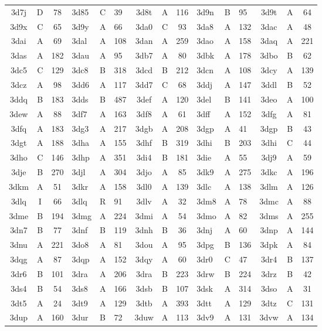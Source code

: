 \begin{longtable}{|c|c|c| a|a|a| c|c|c| a|a|a| c|c|c|}
3d7j & D & 78 & 3d85 & C & 39 & 3d8t & A & 116 & 3d9n & B & 95 & 3d9t & A & 64\\
3d9x & C & 65 & 3d9y & A & 66 & 3da0 & C & 93 & 3da8 & A & 132 & 3dac & A & 48\\
3dai & A & 69 & 3dal & A & 108 & 3dan & A & 259 & 3dao & A & 158 & 3daq & A & 221\\
3das & A & 182 & 3dau & A & 95 & 3db7 & A & 80 & 3dbk & A & 178 & 3dbo & B & 62\\
3dc5 & C & 129 & 3dc8 & B & 318 & 3dcd & B & 212 & 3dcn & A & 108 & 3dcy & A & 139\\
3dcz & A & 98 & 3dd6 & A & 117 & 3dd7 & C & 68 & 3ddj & A & 147 & 3ddl & B & 52\\
3ddq & B & 183 & 3dds & B & 487 & 3def & A & 120 & 3del & B & 141 & 3deo & A & 100\\
3dew & A & 88 & 3df7 & A & 163 & 3df8 & A & 61 & 3dff & A & 152 & 3dfg & A & 81\\
3dfq & A & 183 & 3dg3 & A & 217 & 3dgb & A & 208 & 3dgp & A & 41 & 3dgp & B & 43\\
3dgt & A & 188 & 3dha & A & 155 & 3dhf & B & 319 & 3dhi & B & 203 & 3dhi & C & 44\\
3dho & C & 146 & 3dhp & A & 351 & 3di4 & B & 181 & 3die & A & 55 & 3dj9 & A & 59\\
3dje & B & 270 & 3djl & A & 304 & 3djo & A & 85 & 3dk9 & A & 275 & 3dkc & A & 196\\
3dkm & A & 51 & 3dkr & A & 158 & 3dl0 & A & 139 & 3dlc & A & 138 & 3dlm & A & 126\\
3dlq & I & 66 & 3dlq & R & 91 & 3dlv & A & 32 & 3dm8 & A & 78 & 3dmc & A & 88\\
3dme & B & 194 & 3dmg & A & 224 & 3dmi & A & 54 & 3dmo & A & 82 & 3dms & A & 255\\
3dn7 & B & 77 & 3dnf & B & 119 & 3dnh & B & 36 & 3dnj & A & 60 & 3dnp & A & 144\\
3dnu & A & 221 & 3do8 & A & 81 & 3dou & A & 95 & 3dpg & B & 136 & 3dpk & A & 84\\
3dqg & A & 87 & 3dqp & A & 152 & 3dqy & A & 60 & 3dr0 & C & 47 & 3dr4 & B & 137\\
3dr6 & B & 101 & 3dra & A & 206 & 3dra & B & 223 & 3drw & B & 224 & 3drz & B & 42\\
3ds4 & B & 54 & 3ds8 & A & 166 & 3dsb & B & 107 & 3dsk & A & 314 & 3dso & A & 31\\
3dt5 & A & 24 & 3dt9 & A & 129 & 3dtb & A & 393 & 3dtt & A & 129 & 3dtz & C & 131\\
3dup & A & 160 & 3dur & B & 72 & 3duw & A & 113 & 3dv9 & A & 131 & 3dvw & A & 134\\

\end{longtable}
